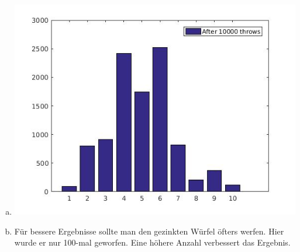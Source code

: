 \documentclass[a4paper]{scrartcl}
\begin{document}
\begin{enumerate}[a)]
	\item 
		\includegraphics[width=.6\textwidth]{plots/4e.jpg}
	\item 
		Für bessere Ergebnisse sollte man den gezinkten Würfel öfters werfen. Hier wurde er nur 100-mal geworfen. Eine höhere Anzahl verbessert das Ergebnis.

	
\end{enumerate}
\end{document}

